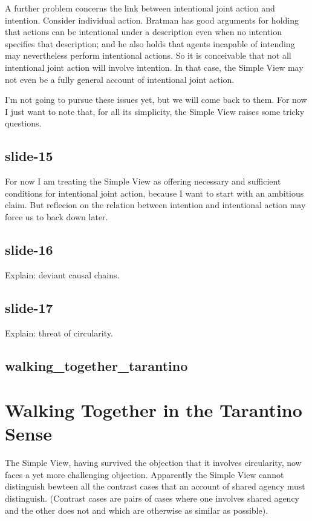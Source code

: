 \documentclass[12pt,\papersize]{extarticle}
\begin{document}
A further problem concerns the link between intentional joint action and intention.
Consider individual action.  Bratman has good arguments for holding that actions can
be intentional under a description even when no intention specifies that description;
and he also holds that agents incapable of intending may nevertheless perform intentional
actions.
So it is conceivable that not all intentional joint action will involve intention.
In that case, the Simple View may not even be a fully general account of intentional
joint action.

I’m not going to pursue these issues yet, but we will come back to them.
For now I just want to note that, for all its simplicity, the Simple View raises some
tricky questions.

\subsection{slide-15}
For now I am treating the Simple View as offering necessary and sufficient conditions
for intentional joint action, because I want to start with an ambitious claim.
But reflecion on the relation between intention and intentional action may force us to back
down later.

\subsection{slide-16}
Explain: deviant causal chains.

\subsection{slide-17}
Explain: threat of circularity.

\subsection{walking\_together\_tarantino}


\section{Walking Together in the Tarantino Sense}

The Simple View, having survived the objection that it involves circularity,
now faces a yet more challenging objection.
Apparently the Simple View cannot distinguish bewteen all the contrast cases
that an account of shared agency must distinguish.
(Contrast cases are pairs of cases where one involves shared agency
and the other does not and which are otherwise as similar as possible).
\end{document}
